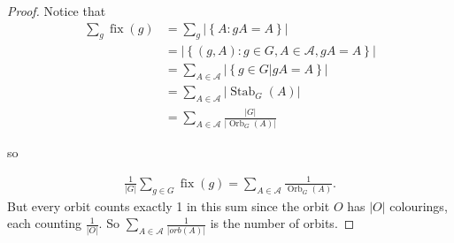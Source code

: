 \documentclass{article}
\theoremstyle{definition}
\newcommand{\A}{\mathcal{A}}
\DeclareMathOperator{\Orb}{Orb}
\DeclareMathOperator{\Stab}{Stab}
\DeclareMathOperator{\fix}{fix}
\begin{document}
   \begin{proof}
     Notice that
\begin{align*}
  \sum_g \fix(g) &= \sum_g |\left\{ A : gA = A \right\}| \\
  &= |\left\{ (g,A) : g \in G, A \in \mathcal{A},gA=A \right\}|\\
  &= \sum_{A \in \mathcal{A}}|\left\{ g \in G | gA = A \right\}|\\
  &= \sum_{A \in \A} |\Stab_G(A)|\\
  &= \sum_{A \in \A} \frac{|G|}{|\Orb_G(A)|}
\end{align*}

so

\begin{align*}
  \frac{1}{|G|}\sum_{g \in G} \fix(g) = \sum_{A \in \A} \frac{1}{\Orb_G(A)}.
\end{align*}
  But every orbit counts exactly 1 in this sum since the orbit $O$ has $|O|$ colourings, each counting $\frac{1}{|O|}$. So $\sum_{A \in \mathcal{A}}\frac{1}{|orb(A)|}$ is the number of orbits.
\end{proof}
\end{document}
